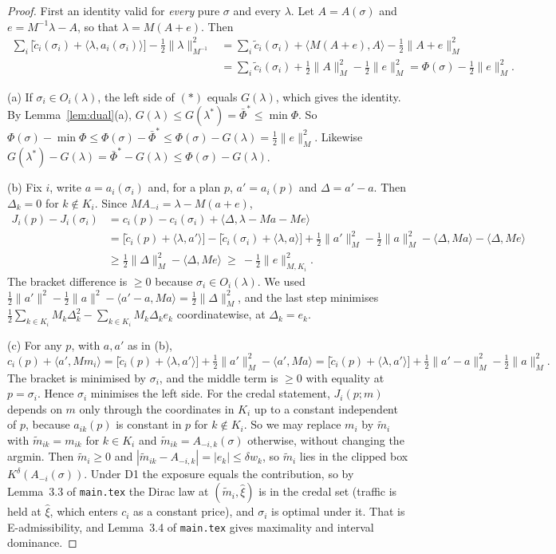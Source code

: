 \documentclass[11pt]{article}
\theoremstyle{definition}
\theoremstyle{remark}
\newcommand{\ip}[2]{\langle #1,#2\rangle}
\begin{document}
\begin{proof}
First an identity valid for \emph{every} pure $\sigma$ and every $\lambda$. Let $A=A(\sigma)$ and $e=M^{-1}\lambda-A$, so that $\lambda=M(A+e)$. Then
\begin{align*}
\sum_i\big[\tilde c_i(\sigma_i)+\ip{\lambda}{a_i(\sigma_i)}\big]-\tfrac12\|\lambda\|^2_{M^{-1}}
&=\sum_i\tilde c_i(\sigma_i)+\ip{M(A+e)}{A}-\tfrac12\|A+e\|_M^2\\
&=\sum_i\tilde c_i(\sigma_i)+\tfrac12\|A\|_M^2-\tfrac12\|e\|_M^2=\Phi(\sigma)-\tfrac12\|e\|_M^2.\tag{$\ast$}
\end{align*}

(a) If $\sigma_i\in O_i(\lambda)$, the left side of $(\ast)$ equals $G(\lambda)$, which gives the identity. By Lemma~\ref{lem:dual}(a), $G(\lambda)\le G(\lambda^*)=\bar\Phi^*\le\min\Phi$. So $\Phi(\sigma)-\min\Phi\le\Phi(\sigma)-\bar\Phi^*\le\Phi(\sigma)-G(\lambda)=\tfrac12\|e\|^2_M$. Likewise $G(\lambda^*)-G(\lambda)=\bar\Phi^*-G(\lambda)\le\Phi(\sigma)-G(\lambda)$.

(b) Fix $i$, write $a=a_i(\sigma_i)$ and, for a plan $p$, $a'=a_i(p)$ and $\Delta=a'-a$. Then $\Delta_k=0$ for $k\notin K_i$. Since $MA_{-i}=\lambda-M(a+e)$,
\begin{align*}
J_i(p)-J_i(\sigma_i)&=c_i(p)-c_i(\sigma_i)+\ip{\Delta}{\lambda-Ma-Me}\\
&=\big[\tilde c_i(p)+\ip{\lambda}{a'}\big]-\big[\tilde c_i(\sigma_i)+\ip{\lambda}{a}\big]+\tfrac12\|a'\|^2_M-\tfrac12\|a\|^2_M-\ip{\Delta}{Ma}-\ip{\Delta}{Me}\\
&\ge\tfrac12\|\Delta\|_M^2-\ip{\Delta}{Me}\ \ge\ -\tfrac12\|e\|^2_{M,K_i}.
\end{align*}
The bracket difference is $\ge0$ because $\sigma_i\in O_i(\lambda)$. We used $\tfrac12\|a'\|^2-\tfrac12\|a\|^2-\ip{a'-a}{Ma}=\tfrac12\|\Delta\|^2_M$, and the last step minimises $\tfrac12\sum_{k\in K_i}M_k\Delta_k^2-\sum_{k\in K_i}M_k\Delta_ke_k$ coordinatewise, at $\Delta_k=e_k$.

(c) For any $p$, with $a,a'$ as in (b),
\[c_i(p)+\ip{a'}{Mm_i}=\big[\tilde c_i(p)+\ip{\lambda}{a'}\big]+\tfrac12\|a'\|^2_M-\ip{a'}{Ma}=\big[\tilde c_i(p)+\ip{\lambda}{a'}\big]+\tfrac12\|a'-a\|^2_M-\tfrac12\|a\|^2_M.\]
The bracket is minimised by $\sigma_i$, and the middle term is $\ge0$ with equality at $p=\sigma_i$. Hence $\sigma_i$ minimises the left side. For the credal statement, $J_i(p;m)$ depends on $m$ only through the coordinates in $K_i$ up to a constant independent of $p$, because $a_{ik}(p)$ is constant in $p$ for $k\notin K_i$. So we may replace $m_i$ by $\tilde m_i$ with $\tilde m_{ik}=m_{ik}$ for $k\in K_i$ and $\tilde m_{ik}=A_{-i,k}(\sigma)$ otherwise, without changing the argmin. Then $\tilde m_i\ge0$ and $|\tilde m_{ik}-A_{-i,k}|=|e_k|\le\delta w_k$, so $\tilde m_i$ lies in the clipped box $K^\delta(A_{-i}(\sigma))$. Under D1 the exposure equals the contribution, so by Lemma~3.3 of \texttt{main.tex} the Dirac law at $(\tilde m_i,\hat\xi)$ is in the credal set (traffic is held at $\hat\xi$, which enters $c_i$ as a constant price), and $\sigma_i$ is optimal under it. That is E-admissibility, and Lemma~3.4 of \texttt{main.tex} gives maximality and interval dominance.


\end{proof}
\end{document}
